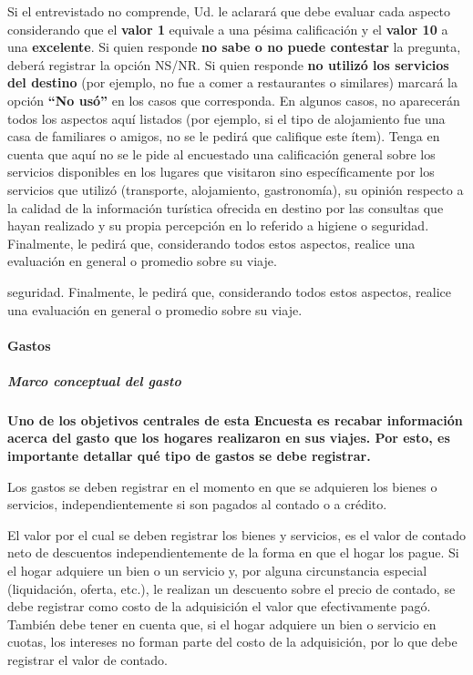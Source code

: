 \documentclass[
  openany]{book}
\begin{document}
Si el entrevistado no comprende, Ud. le aclarará que debe evaluar cada aspecto considerando que el \textbf{valor 1} equivale a una pésima calificación y el \textbf{valor 10} a una \textbf{excelente}. Si quien responde \textbf{no sabe o no puede contestar} la pregunta, deberá registrar la opción NS/NR. Si quien responde \textbf{no utilizó los servicios del destino} (por ejemplo, no fue a comer a restaurantes o similares) marcará la opción \textbf{``No usó''} en los casos que corresponda. En algunos casos, no aparecerán todos los aspectos aquí listados (por ejemplo, si el tipo de alojamiento fue una casa de familiares o amigos, no se le pedirá que califique este ítem). Tenga en cuenta que aquí no se le pide al encuestado una calificación general sobre los servicios disponibles en los lugares que visitaron sino específicamente por los servicios que utilizó (transporte, alojamiento, gastronomía), su opinión respecto a la calidad de la información turística ofrecida en destino por las consultas que hayan realizado y su propia percepción en lo referido a higiene o seguridad. Finalmente, le pedirá que, considerando todos estos aspectos, realice una evaluación en general o promedio sobre su viaje.

seguridad. Finalmente, le pedirá que, considerando todos estos aspectos, realice una evaluación en general o promedio sobre su viaje.

\hypertarget{gastos}{%
\paragraph{Gastos}\label{gastos}}

\hypertarget{marco-conceptual-del-gasto}{%
\subparagraph{Marco conceptual del gasto}\label{marco-conceptual-del-gasto}}

\textbf{Uno de los objetivos centrales de esta Encuesta es recabar información acerca del gasto que los hogares realizaron en sus viajes. Por esto, es importante detallar qué tipo de gastos se debe registrar.}

Los gastos se deben registrar en el momento en que se adquieren los bienes o servicios, independientemente si son pagados al contado o a crédito.

El valor por el cual se deben registrar los bienes y servicios, es el valor de contado neto de descuentos independientemente de la forma en que el hogar los pague. Si el hogar adquiere un bien o un servicio y, por alguna circunstancia especial (liquidación, oferta, etc.), le realizan un descuento sobre el precio de contado, se debe registrar como costo de la adquisición el valor que efectivamente pagó. También debe tener en cuenta que, si el hogar adquiere un bien o servicio en cuotas, los intereses no forman parte del costo de la adquisición, por lo que debe registrar el valor de contado.
\end{document}
